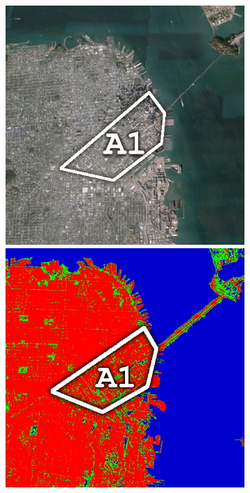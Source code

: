 \begin{figure}[tbp]
\begin{subfigure}[t]{0.19\textwidth}
\includegraphics[width=\columnwidth]{Figures/ALOS2_SF_3Class/SouthMarketIm}  
\vspace{0.2cm}
\includegraphics[width=\columnwidth]{Figures/ALOS2_SF_3Class/SouthMarket}

\end{subfigure}
\end{figure}
